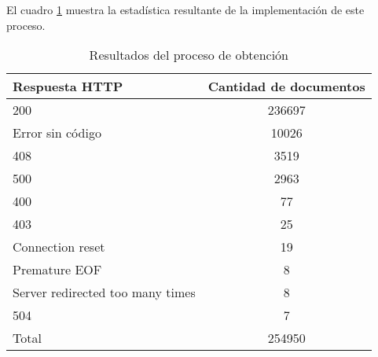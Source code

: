 \noindent El cuadro \ref{table:ObtencionResults} muestra la estadística resultante de la implementación de este proceso.
\begin{table}[h]
\begin{tabular}{| l | c | }\hline
   Respuesta HTTP & Cantidad de documentos \\\hline
   200 & 236697 \\
   Error sin código & 10026 \\
   408 & 3519 \\
   500 & 2963 \\
   400 & 77 \\
   403 & 25 \\
   Connection reset & 19 \\
   Premature EOF & 8 \\
   Server redirected too many times & 8 \\
   504 & 7 \\\hline
   Total & 254950 \\\hline
 \end{tabular}
\caption{Resultados del proceso de obtención}
\label{table:ObtencionResults}
\end{table}
